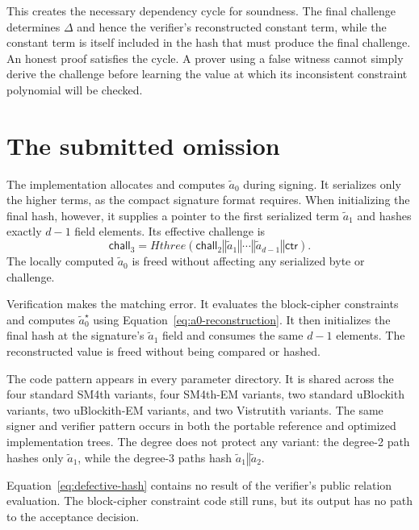 \documentclass[11pt,a4paper]{article}
\newcommand{\concat}{\mathbin\Vert}
\begin{document}
This creates the necessary dependency cycle for soundness.  The final
challenge determines $\Delta$ and hence the verifier's reconstructed constant
term, while the constant term is itself included in the hash that must produce
the final challenge.  An honest proof satisfies the cycle.  A prover using a
false witness cannot simply derive the challenge before learning the value at
which its inconsistent constraint polynomial will be checked.

\section{The submitted omission}
\label{sec:bug}

The implementation allocates and computes $\widetilde a_0$ during signing.
It serializes only the higher terms, as the compact signature format requires.
When initializing the final hash, however, it supplies a pointer to the first
serialized term $\widetilde a_1$ and hashes exactly $d-1$ field elements.  Its
effective challenge is
\begin{equation}
 \mathsf{chall}_3=Hthree(
    \mathsf{chall}_2\concat
    \widetilde a_1\concat\cdots\concat
    \widetilde a_{d-1}\concat\mathsf{ctr}).
\label{eq:defective-hash}
\end{equation}
The locally computed $\widetilde a_0$ is freed without affecting any
serialized byte or challenge.

Verification makes the matching error.  It evaluates the block-cipher
constraints and computes $\widetilde a_0^{\star}$ using
Equation~\eqref{eq:a0-reconstruction}.  It then initializes the final hash at
the signature's $\widetilde a_1$ field and consumes the same $d-1$ elements.
The reconstructed value is freed without being compared or hashed.

The code pattern appears in every parameter directory.  It is shared across
the four standard SM4th variants, four SM4th-EM variants, two standard
uBlockith variants, two uBlockith-EM variants, and two Vistrutith variants.
The same signer and verifier pattern occurs in both the portable reference and
optimized implementation trees.  The degree does not protect any variant:
the degree-2 path hashes only $\widetilde a_1$, while the degree-3 paths hash
$\widetilde a_1\concat\widetilde a_2$.

Equation~\eqref{eq:defective-hash} contains no result of the verifier's public
relation evaluation.  The block-cipher constraint code still runs, but its
output has no path to the acceptance decision.
\end{document}

